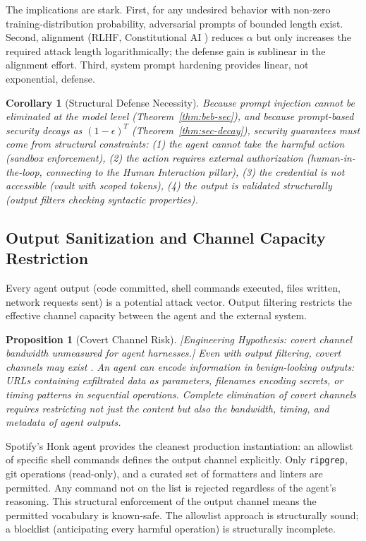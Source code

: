 \documentclass[11pt, a4paper]{googledeepmind}
\newtheorem{proposition}{Proposition}[section]
\newtheorem{corollary}{Corollary}[section]
\begin{document}
The implications are stark. First, for any undesired behavior with non-zero training-distribution probability, adversarial prompts of bounded length exist. Second, alignment (RLHF, Constitutional AI \citep{bai2022constitutional}) reduces $\alpha$ but only increases the required attack length logarithmically; the defense gain is sublinear in the alignment effort. Third, system prompt hardening provides linear, not exponential, defense.

\begin{corollary}[Structural Defense Necessity]
\label{cor:structural-defense-sec}
Because prompt injection cannot be eliminated at the model level (Theorem~\ref{thm:beb-sec}), and because prompt-based security decays as $(1-\epsilon)^T$ (Theorem~\ref{thm:sec-decay}), security guarantees must come from structural constraints: (1) the agent \emph{cannot} take the harmful action (sandbox enforcement), (2) the action requires external authorization (human-in-the-loop, connecting to the Human Interaction pillar), (3) the credential is not accessible (vault with scoped tokens), (4) the output is validated structurally (output filters checking syntactic properties).
\end{corollary}

\subsection{Output Sanitization and Channel Capacity Restriction}

Every agent output (code committed, shell commands executed, files written, network requests sent) is a potential attack vector. Output filtering restricts the effective channel capacity between the agent and the external system.

\begin{proposition}[Covert Channel Risk]
\emph{[Engineering Hypothesis: covert channel bandwidth unmeasured for agent harnesses.]}
\label{prop:covert-sec}
Even with output filtering, covert channels may exist \citep{lampson1973confinement}. An agent can encode information in benign-looking outputs: URLs containing exfiltrated data as parameters, filenames encoding secrets, or timing patterns in sequential operations. Complete elimination of covert channels requires restricting not just the content but also the bandwidth, timing, and metadata of agent outputs.
\end{proposition}

Spotify's Honk agent \citep{spotify2025honk} provides the cleanest production instantiation: an allowlist of specific shell commands defines the output channel explicitly. Only \texttt{ripgrep}, git operations (read-only), and a curated set of formatters and linters are permitted. Any command not on the list is rejected regardless of the agent's reasoning. This structural enforcement of the output channel means the permitted vocabulary is known-safe. The allowlist approach is structurally sound; a blocklist (anticipating every harmful operation) is structurally incomplete.
\end{document}
